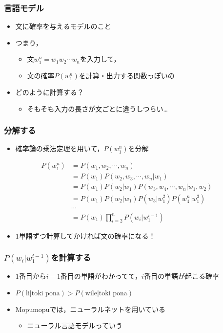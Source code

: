\documentclass[14pt]{beamer}
\begin{document}
\begin{frame}
	\frametitle{言語モデル}

	\begin{itemize}
		\item 文に確率を与えるモデルのこと
		\item つまり，
			\begin{itemize}
				\item 文$w_1^n = w_1 w_2 \cdots w_n$を入力して，
				\item 文の確率$P(w_1^n)$を計算・出力する関数っぽいの
			\end{itemize}
		\item どのように計算する？
			\begin{itemize}
				\item そもそも入力の長さが文ごとに違うしつらい…
			\end{itemize}
	\end{itemize}
\end{frame}

\begin{frame}
	\frametitle{分解する}

	\begin{itemize}
		\item 確率論の乗法定理を用いて，$P(w_1^n)$を分解
	\end{itemize}
	\begin{align*}
		P(w_1^n)
			& = P(w_1, w_2, \cdots, w_n) \\
			& = P(w_1) P(w_2, w_3, \cdots, w_n | w_1) \\
			& = P(w_1) P(w_2 | w_1) P(w_3, w_4, \cdots, w_n | w_1, w_2) \\
			& = P(w_1) P(w_2 | w_1) P(w_3 | w_1^2) P(w_4^n | w_1^3) \\
			& \cdots \\
			& = P(w_1) \prod_{i=2}^{n} P(w_i | w_1^{i-1})
	\end{align*}

	\begin{itemize}
		\item 1単語ずつ計算してかければ文の確率になる！
	\end{itemize}

\end{frame}

\begin{frame}
	\frametitle{$P(w_i | w_1^{i-1})$を計算する}

	\begin{itemize}
		\item $1$番目から$i-1$番目の単語がわかってて，$i$番目の単語が起こる確率
		\item $P(\text{li} | \text{toki pona}) > P(\text{wile} | \text{toki pona})$ 
		\item Mopumopuでは，ニューラルネットを用いている
			\begin{itemize}
				\item ニューラル言語モデルっていう
			\end{itemize}
	\end{itemize}
\end{frame}
\end{document}
